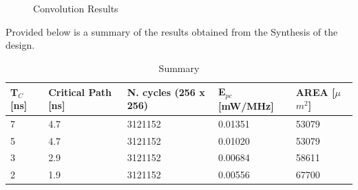 \documentclass[11pt,a4paper]{article}
\begin{document}
\begin{figure}[htp]
  \begin{center}
    \hspace{1in}
  \end{center}
  \caption{Convolution Results}
  \label{fig:lenanew}
\end{figure}

\FloatBarrier

Provided below is a summary of the results obtained from the Synthesis of the design.

\begin{table}[h]
	\caption{Summary}
	\begin{center}
		\begin{tabular}{|p{1cm}|p{2cm}|p{2cm}|l|l|} \hline
			\textbf{T}$_C$ [ns] & \textbf{Critical Path} [ns] & \textbf{N. cycles} (256 x 256) & \textbf{E}$_{pc}$ [mW/MHz] & \textbf{AREA} [$\mu$$m^2$] \\ \hline
			7 & 4.7 & 3121152 & 0.01351 & 53079 \\ \hline
			5 & 4.7 & 3121152 & 0.01020 & 53079 \\ \hline
			3 & 2.9 & 3121152 & 0.00684 & 58611 \\ \hline
			2 & 1.9 & 3121152 & 0.00556 & 67700 \\ \hline
		
		\end{tabular}
	\end{center}
	\label{tab:conclusion}
\end{table}
\end{document}
